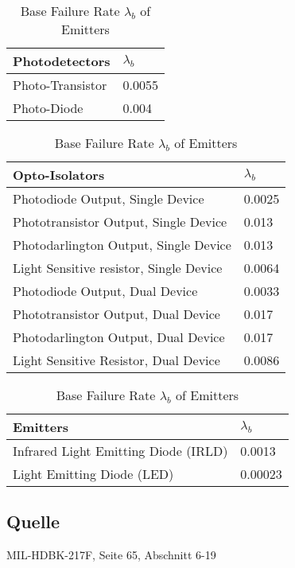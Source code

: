 \begin{table}[ht]
{\centering

\begin{tabular}{|p{7.5cm}|p{5cm}|}
    \hline
    \textbf{Photodetectors} & \textbf{$\lambda_b$} \\
    \hline
    Photo-Transistor & 0.0055 \\
    \hline
    Photo-Diode & 0.004 \\
    \hline
\end{tabular}
\caption{Base Failure Rate $\lambda_b$ of Photodetectors}
\label{tab:bfr_photodetectors}
\vspace{\baselineskip}
\begin{tabular}{|p{7.5cm}|p{5cm}|}
    \hline
    \textbf{Opto-Isolators} & \textbf{$\lambda_b$} \\
    \hline
    Photodiode Output, Single Device & 0.0025 \\
    \hline
    Phototransistor Output, Single Device & 0.013 \\
    \hline
    Photodarlington Output, Single Device & 0.013 \\
    \hline
    Light Sensitive resistor, Single Device & 0.0064 \\
    \hline
    Photodiode Output, Dual Device & 0.0033 \\
    \hline
    Phototransistor Output, Dual Device & 0.017 \\
    \hline
    Photodarlington Output, Dual Device & 0.017 \\
    \hline
    Light Sensitive Resistor, Dual Device & 0.0086 \\
    \hline
\end{tabular}
\caption{Base Failure Rate $\lambda_b$ of Opto-Isolators}
\label{tab:bfr_Opto-isolators}
\vspace{\baselineskip}
\begin{tabular}{|p{7.5cm}|p{5cm}|}
    \hline
    \textbf{Emitters} & \textbf{$\lambda_b$} \\
    \hline
    Infrared Light Emitting Diode (IRLD) & 0.0013 \\
    \hline
    Light Emitting Diode (LED) & 0.00023 \\
    \hline
\end{tabular}
\caption{Base Failure Rate $\lambda_b$ of Emitters}
\label{tab:bfr_emitters}

\par}
\subsection*{Quelle}
MIL-HDBK-217F, Seite 65, Abschnitt 6-19
\end{table}